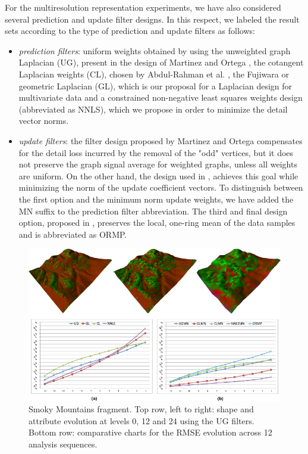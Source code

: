 \documentclass[graybox]{svmult}
\begin{document}
	
	For the multiresolution representation experiments, we have also considered several prediction and update filter designs. In this respect, we labeled the result sets according to the type of prediction and update filters as follows:
	\begin{itemize}
		\item{\emph{prediction filters}}: uniform weights obtained by using the unweighted graph Laplacian ({UG}), present in the design of Martinez and Ortega \cite{Martinez2011}, the cotangent Laplacian weights ({CL}), chosen by Abdul-Rahman et al. \cite{AbdulRahman2013}, the Fujiwara or geometric Laplacian ({GL}), which is our proposal for a Laplacian design for multivariate data and a constrained  non-negative least squares weights design (abbreviated as {NNLS}), which we propose in order to minimize the detail vector norms.
		\item{\emph{update filters}}: the filter design proposed by Martinez and Ortega \cite{Martinez2011} compensates for the detail loss incurred by the removal of the "odd" vertices, but it does not preserve the graph signal average for weighted graphs, unless all weights are uniform. On the other hand, the design used in \cite{Jansen2001,Wagner2005}, achieves this goal while minimizing the norm of the update coefficient vectors. To distinguish between the first option and the minimum norm update weights, we have added the {MN} suffix to the prediction filter abbreviation. The third and final design option, proposed in \cite{AbdulRahman2013}, preserves the local, one-ring mean of the data samples  and is abbreviated as {ORMP}.
	\end{itemize}
	
	\begin{figure}[!htbp]
		\centering
		\includegraphics{smokey_lod_rmse.pdf}
		
		\caption{\label{fig_cds:smokey_lod_rmse}%
			Smoky Mountains fragment. Top row, left to right: shape and attribute evolution at levels 0, 12 and 24 using the {UG} filters. Bottom row: comparative charts for the RMSE evolution across 12 analysis sequences. }
	\end{figure}
	
\end{document}
